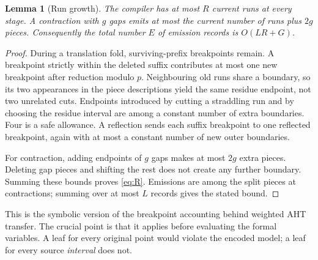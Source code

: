 \documentclass[11pt]{article}
\newtheorem{lemma}[theorem]{Lemma}
\theoremstyle{definition}\newtheorem{definition}[theorem]{Definition}
\theoremstyle{remark}\newtheorem{remark}[theorem]{Remark}
\begin{document}
\begin{lemma}[Run growth]
\label{lem:runs}
The compiler has at most $R$ current runs at every stage. A contraction with $g$
gaps emits at most the current number of runs plus $2g$ pieces. Consequently the
total number $E$ of emission records is $O(LR+G)$.
\end{lemma}
\begin{proof}
During a translation fold, surviving-prefix breakpoints remain. A breakpoint
strictly within the deleted suffix contributes at most one new breakpoint after
reduction modulo $p$. Neighbouring old runs share a boundary, so its two
appearances in the piece descriptions yield the same residue endpoint, not two
unrelated cuts. Endpoints introduced by cutting a straddling run and by choosing
the residue interval are among a constant number of extra boundaries. Four is
a safe allowance. A reflection sends each suffix breakpoint to one reflected
breakpoint, again with at most a constant number of new outer boundaries.

For contraction, adding endpoints of $g$ gaps makes at most $2g$ extra pieces.
Deleting gap pieces and shifting the rest does not create any further boundary.
Summing these bounds proves \eqref{eq:R}. Emissions are among the split pieces
at contractions; summing over at most $L$ records gives the stated bound.
\end{proof}

This is the symbolic version of the breakpoint accounting behind weighted AHT
transfer. The crucial point is that it applies before evaluating the formal
variables. A leaf for every original point would violate the encoded model; a
leaf for every source \emph{interval} does not.
\end{document}
